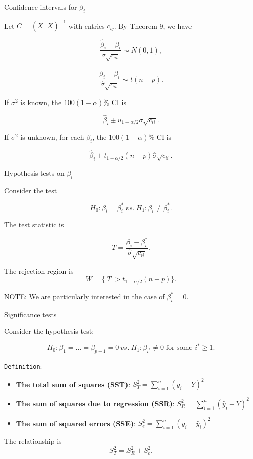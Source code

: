 \documentclass[ignorenonframetext,]{beamer}
\begin{document}
\begin{frame}{Confidence intervals for \(\beta_i\)}
\protect\hypertarget{confidence-intervals-for-beta_i}{}

Let \(C=(X^\top X)^{-1}\) with entries \(c_{ij}\). By Theorem 9, we have

\[\frac{\hat\beta_i-\beta_i}{\sigma\sqrt{c_{ii}}}\sim N(0,1),\]

\[\frac{\hat\beta_i-\beta_i}{\hat\sigma\sqrt{c_{ii}}}\sim t(n-p).\]

If \(\sigma^2\) is known, the \(100(1-\alpha)\%\) CI is

\[\hat\beta_i \pm u_{1-\alpha/2}\sigma\sqrt{c_{ii}}.\]

If \(\sigma^2\) is unknown, for each \(\beta_i\), the
\(100(1-\alpha)\%\) CI is

\[\hat\beta_i \pm t_{1-\alpha/2}(n-p)\hat\sigma\sqrt{c_{ii}}.\]

\end{frame}

\begin{frame}{Hypothesis tests on \(\beta_i\)}
\protect\hypertarget{hypothesis-tests-on-beta_i}{}

Consider the test

\[H_0:\beta_i= \beta_i^*\ vs.\ H_1:\beta_i\neq \beta_i^*.\]

The test statistic is

\[T = \frac{\hat\beta_i-\beta_i^*}{\hat\sigma\sqrt{c_{ii}}}.\]

The rejection region is \[W = \{|T|>t_{1-\alpha/2}(n-p)\}.\]

NOTE: We are particularly interested in the case of \(\beta^*_i=0\).

\end{frame}

\begin{frame}[fragile]{Significance tests}
\protect\hypertarget{significance-tests}{}

Consider the hypothesis test:

\[H_0:\beta_1=\dots=\beta_{p-1}=0\ vs.\ H_1: \beta_{i^*}\neq 0\text{ for some }i^*\ge 1.\]

\texttt{Definition}:

\begin{itemize}
\item
  \textbf{The total sum of squares (SST)}:
  \(S_T^2 = \sum_{i=1}^n(y_i-\bar Y)^2\)
\item
  \textbf{The sum of squares due to regression (SSR)}:
  \(S_R^2 = \sum_{i=1}^n(\hat y_i-\bar Y)^2\)
\item
  \textbf{The sum of squared errors (SSE)}:
  \(S_e^2 = \sum_{i=1}^n(y_i-\hat y_i)^2\)
\end{itemize}

The relationship is \[S_T^2=S_R^2+S_e^2.\]

\end{frame}
\end{document}
